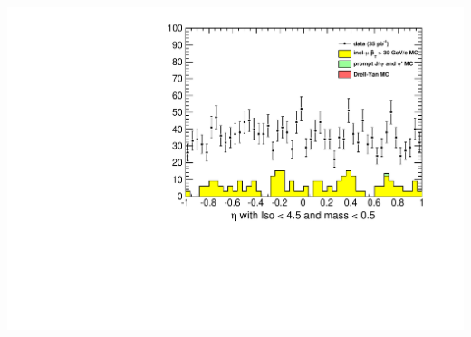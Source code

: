 \documentclass[compress]{beamer}
\begin{document}
\begin{frame}
\begin{columns}
\includegraphics[width=\linewidth]{lowdimuon_eta_lowmass_isolated.pdf}
\end{columns}
\end{frame}
\end{document}
